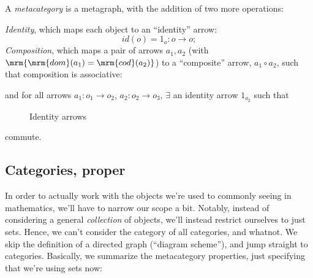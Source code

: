 \documentclass{fkbook}
\renewcommand{\dom}{\mrm{dom}}
\renewcommand{\cod}{\mrm{cod}}
\begin{document}
\begin{definition}[Metacategory]
  A \emph{metacategory} is a metagraph, with the addition of two more
  operations:

  \emph{Identity}, which maps each object to an ``identity'' arrow:
  \[
    id(o) = 1_o : o \to o;
  \]
  \emph{Composition}, which maps a pair of arrows $a_1, a_2$ (with
  $\mrm{\dom(a_1) = \cod(a_2)}$) to a ``composite'' arrow, $a_1 \circ
  a_2$, such that composition is associative:
  \begin{figure}[H]
    \centering
  \end{figure}
  and for all arrows $a_1
  : o_1 \to o_2$, $a_2 : o_2 \to o_3$, $\exists$ an identity arrow
  $1_{o_2}$ such that
  \begin{figure}[H]
    \centering
    \begin{minipage}{.49\linewidth}
      \centering
    \end{minipage}
    \begin{minipage}{.49\linewidth}
      \centering
    \end{minipage}
    \caption{Identity arrows}
  \end{figure}
  commute.
\end{definition}

\subsection{Categories, proper}
In order to actually work with the objects we're used to commonly
seeing in mathematics, we'll have to narrow our scope a bit. Notably,
instead of considering a general \emph{collection} of objects, we'll
instead restrict ourselves to just sets. Hence, we can't consider the
category of all categories, and whatnot. We skip the definition of a
directed graph (``diagram scheme''), and jump straight to categories.
Basically, we summarize the metacategory properties, just specifying
that we're using sets now:
\end{document}
